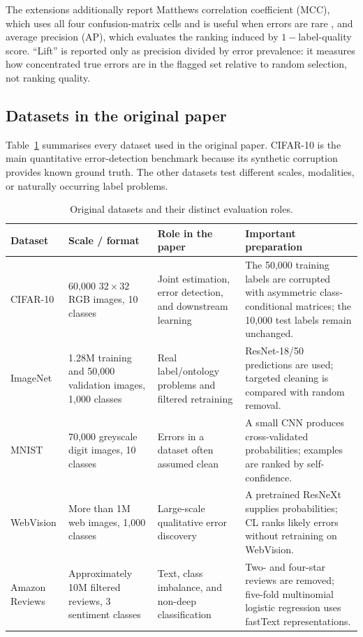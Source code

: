 \documentclass[11pt]{article}
\begin{document}
The extensions additionally report Matthews correlation coefficient (MCC),
which uses all four confusion-matrix cells and is useful when errors are rare
\citep{matthews1975comparison}, and average precision (AP), which evaluates the
ranking induced by $1-$label-quality score. ``Lift'' is reported only as
precision divided by error prevalence: it measures how concentrated true
errors are in the flagged set relative to random selection, not ranking
quality.

\subsection{Datasets in the original paper}

Table~\ref{tab:original-data} summarises every dataset used in the original
paper. CIFAR-10 is the main quantitative error-detection benchmark because its
synthetic corruption provides known ground truth. The other datasets test
different scales, modalities, or naturally occurring label problems.

\begin{table}[t]
\centering
\small
\setlength{\tabcolsep}{4pt}
\renewcommand{\arraystretch}{1.08}
\begin{tabular}{p{2.35cm}p{2.6cm}p{4.0cm}p{5.9cm}}
\toprule
\textbf{Dataset} & \textbf{Scale / format} & \textbf{Role in the paper} & \textbf{Important preparation} \\
\midrule
CIFAR-10 \citep{krizhevsky2009learning}
& 60,000 $32\!\times\!32$ RGB images, 10 classes
& Joint estimation, error detection, and downstream learning
& The 50,000 training labels are corrupted with asymmetric class-conditional matrices; the 10,000 test labels remain unchanged. \\
ImageNet \citep{russakovsky2015imagenet}
& 1.28M training and 50,000 validation images, 1,000 classes
& Real label/ontology problems and filtered retraining
& ResNet-18/50 predictions are used; targeted cleaning is compared with random removal. \\
MNIST \citep{lecun1998gradient}
& 70,000 greyscale digit images, 10 classes
& Errors in a dataset often assumed clean
& A small CNN produces cross-validated probabilities; examples are ranked by self-confidence. \\
WebVision \citep{li2017webvision}
& More than 1M web images, 1,000 classes
& Large-scale qualitative error discovery
& A pretrained ResNeXt supplies probabilities; CL ranks likely errors without retraining on WebVision. \\
Amazon Reviews \citep{he2016ups}
& Approximately 10M filtered reviews, 3 sentiment classes
& Text, class imbalance, and non-deep classification
& Two- and four-star reviews are removed; five-fold multinomial logistic regression uses fastText representations. \\
\bottomrule
\end{tabular}
\caption{Original datasets and their distinct evaluation roles.}
\label{tab:original-data}
\end{table}
\end{document}
